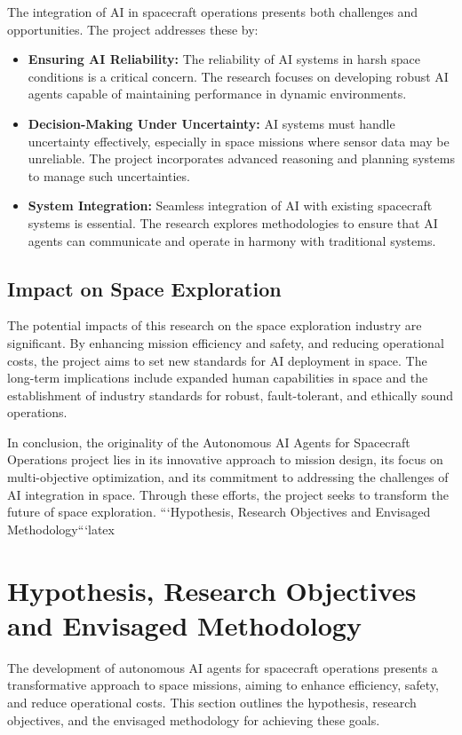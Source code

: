 \documentclass[a4paper, 11pt]{article}
\begin{document}
The integration of AI in spacecraft operations presents both challenges and opportunities. The project addresses these by:

\begin{itemize}
    \item \textbf{Ensuring AI Reliability:} The reliability of AI systems in harsh space conditions is a critical concern. The research focuses on developing robust AI agents capable of maintaining performance in dynamic environments.
    \item \textbf{Decision-Making Under Uncertainty:} AI systems must handle uncertainty effectively, especially in space missions where sensor data may be unreliable. The project incorporates advanced reasoning and planning systems to manage such uncertainties.
    \item \textbf{System Integration:} Seamless integration of AI with existing spacecraft systems is essential. The research explores methodologies to ensure that AI agents can communicate and operate in harmony with traditional systems.
\end{itemize}

\subsection{Impact on Space Exploration}

The potential impacts of this research on the space exploration industry are significant. By enhancing mission efficiency and safety, and reducing operational costs, the project aims to set new standards for AI deployment in space. The long-term implications include expanded human capabilities in space and the establishment of industry standards for robust, fault-tolerant, and ethically sound operations.

In conclusion, the originality of the Autonomous AI Agents for Spacecraft Operations project lies in its innovative approach to mission design, its focus on multi-objective optimization, and its commitment to addressing the challenges of AI integration in space. Through these efforts, the project seeks to transform the future of space exploration.
```Hypothesis, Research Objectives and Envisaged Methodology```latex
\section{Hypothesis, Research Objectives and Envisaged Methodology}

The development of autonomous AI agents for spacecraft operations presents a transformative approach to space missions, aiming to enhance efficiency, safety, and reduce operational costs. This section outlines the hypothesis, research objectives, and the envisaged methodology for achieving these goals.
\end{document}
